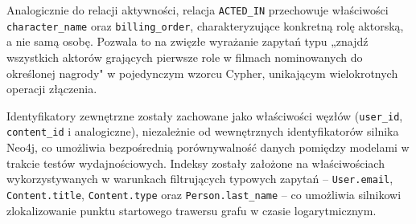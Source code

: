 Analogicznie do relacji aktywności, relacja \texttt{ACTED\_IN} przechowuje
właściwości \texttt{character\_name} oraz \texttt{billing\_order}, charakteryzujące
konkretną rolę aktorską, a nie samą osobę. Pozwala to na zwięzłe wyrażanie
zapytań typu „znajdź wszystkich aktorów grających pierwsze role w filmach
nominowanych do określonej nagrody" w pojedynczym wzorcu Cypher,
unikającym wielokrotnych operacji złączenia.

Identyfikatory zewnętrzne zostały zachowane jako właściwości węzłów
(\texttt{user\_id}, \texttt{content\_id} i analogiczne), niezależnie od
wewnętrznych identyfikatorów silnika Neo4j, co umożliwia bezpośrednią
porównywalność danych pomiędzy modelami w trakcie testów wydajnościowych.
Indeksy zostały założone na właściwościach wykorzystywanych w warunkach
filtrujących typowych zapytań -- \texttt{User.email}, \texttt{Content.title},
\texttt{Content.type} oraz \texttt{Person.last\_name} -- co umożliwia silnikowi
zlokalizowanie punktu startowego trawersu grafu w czasie logarytmicznym.
